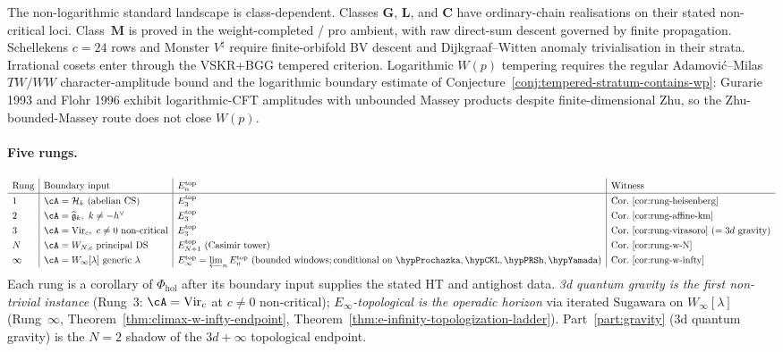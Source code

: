 The non-logarithmic standard landscape is class-dependent. Classes
$\mathbf G$, $\mathbf L$, and $\mathbf C$ have ordinary-chain
realisations on their stated non-critical loci. Class~$\mathbf M$
is proved in the weight-completed / pro ambient, with raw
direct-sum descent governed by finite propagation. Schellekens
$c=24$ rows and Monster $V^\natural$ require finite-orbifold BV
descent and Dijkgraaf--Witten anomaly trivialisation in their
strata. Irrational cosets enter through the VSKR+BGG tempered
criterion.
Logarithmic $W(p)$ tempering requires the regular
Adamovi\'c--Milas $TW/WW$ character-amplitude bound and the logarithmic
boundary estimate of
Conjecture~\ref{conj:tempered-stratum-contains-wp}: Gurarie 1993
and Flohr 1996 exhibit logarithmic-CFT amplitudes with unbounded
Massey products despite finite-dimensional Zhu, so the
Zhu-bounded-Massey route does not close $W(p)$.

\paragraph{Five rungs.}
\[
\renewcommand{\arraystretch}{1.3}
\begin{array}{l|l|l|l}
\text{Rung} & \text{Boundary input} & E_n^{\mathrm{top}} & \text{Witness} \\
\hline
1 & \cA = \cH_k\ (\text{abelian CS}) &
 E_3^{\mathrm{top}} & \text{Cor.~\ref{cor:rung-heisenberg}} \\
2 & \cA = \widehat{\fg}_k,\ k \neq -h^\vee &
 E_3^{\mathrm{top}} & \text{Cor.~\ref{cor:rung-affine-km}} \\
3 & \cA = \mathrm{Vir}_c,\ c \neq 0\ \text{non-critical} &
 E_3^{\mathrm{top}} &
 \text{Cor.~\ref{cor:rung-virasoro}}\ (= 3d\ \text{gravity}) \\
N & \cA = W_{N,c}\ \text{principal DS} &
 E_{N+1}^{\mathrm{top}}\ (\text{Casimir tower})
 & \text{Cor.~\ref{cor:rung-w-N}} \\
\infty & \cA = W_\infty[\lambda]\ \text{generic } \lambda &
 E_\infty^{\mathrm{top}} =
 \varprojlim_n E_n^{\mathrm{top}}\ (\text{bounded windows};
 \text{conditional on } \hypProchazka, \hypCKL, \hypPRSh, \hypYamada) &
 \text{Cor.~\ref{cor:rung-w-infty}}
\end{array}
\]
Each rung is a corollary of $\Phi_{\mathrm{hol}}$ after its
boundary input supplies the stated HT and antighost data.
\emph{3d quantum gravity is the first non-trivial
instance} (Rung~3: $\cA = \mathrm{Vir}_c$ at $c \neq 0$
non-critical); \emph{$E_\infty$-topological is the operadic
horizon} via iterated Sugawara on $W_\infty[\lambda]$
(Rung~$\infty$,
Theorem~\ref{thm:climax-w-infty-endpoint},
Theorem~\ref{thm:e-infinity-topologization-ladder}).
Part~\ref{part:gravity} (3d quantum gravity) is the $N = 2$
shadow of the $3d{+}\infty$ topological endpoint.

